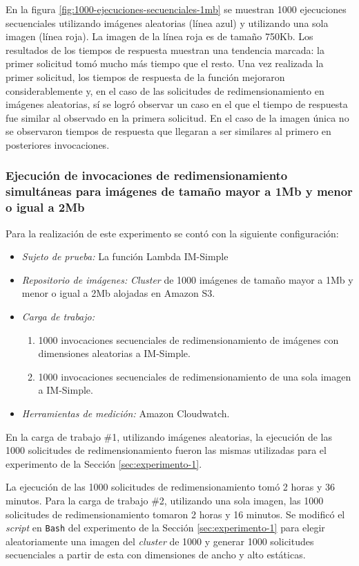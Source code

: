 En la figura \ref{fig:1000-ejecuciones-secuenciales-1mb} se muestran 1000 ejecuciones secuenciales utilizando imágenes aleatorias (línea azul) y utilizando una sola imagen (línea roja). La imagen de la línea roja es de tamaño 750Kb. Los resultados de los tiempos de respuesta muestran una tendencia marcada: la primer solicitud tomó mucho más tiempo que el resto. Una vez realizada la primer solicitud, los tiempos de respuesta de la función mejoraron considerablemente y, en el caso de las solicitudes de redimensionamiento en imágenes aleatorias, sí se logró observar un caso en el que el tiempo de respuesta fue similar al observado en la primera solicitud. En el caso de la imagen única no se observaron tiempos de respuesta que llegaran a ser similares al primero en posteriores invocaciones. 


\subsubsection{Ejecución de invocaciones de redimensionamiento simultáneas para imágenes de tamaño mayor a 1Mb y menor o igual a 2Mb}

Para la realización de este experimento se contó con la siguiente configuración:
\begin{itemize}
    \item \emph{Sujeto de prueba:} La función Lambda IM-Simple
    \item \emph{Repositorio de imágenes:} \emph{Cluster} de 1000 imágenes de tamaño mayor a 1Mb y menor o igual a 2Mb alojadas en Amazon S3.
    \item \emph{Carga de trabajo:} 
    \begin{enumerate}
        \item 1000 invocaciones secuenciales de redimensionamiento de imágenes con dimensiones aleatorias a IM-Simple.
        \item 1000 invocaciones secuenciales de redimensionamiento de una sola imagen a IM-Simple.
    \end{enumerate}
    \item \emph{Herramientas de medición:} Amazon Cloudwatch.
\end{itemize}

En la carga de trabajo \#1, utilizando imágenes aleatorias, la ejecución de las 1000 solicitudes de redimensionamiento fueron las mismas utilizadas para el experimento de la Sección \ref{sec:experimento-1}. 

La ejecución de las 1000 solicitudes de redimensionamiento tomó 2 horas y 36 minutos. Para la carga de trabajo \#2, utilizando una sola imagen, las 1000 solicitudes de redimensionamiento tomaron 2 horas y 16 minutos. Se modificó el \emph{script} en \texttt{Bash} del experimento de la Sección \ref{sec:experimento-1} para elegir aleatoriamente una imagen del \emph{cluster} de 1000 y generar 1000 solicitudes secuenciales a partir de esta con dimensiones de ancho y alto estáticas.


